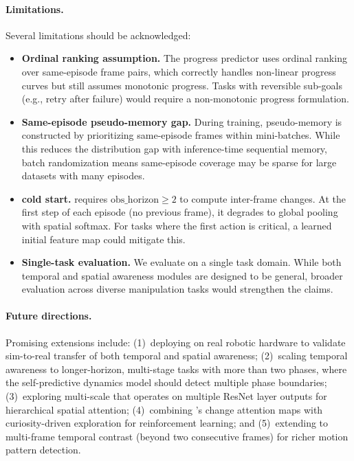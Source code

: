 \paragraph{Limitations.} Several limitations should be acknowledged:
\begin{itemize}[leftmargin=*,itemsep=2pt]
    \item \textbf{Ordinal ranking assumption.} The progress predictor uses ordinal ranking over same-episode frame pairs, which correctly handles non-linear progress curves but still assumes monotonic progress. Tasks with reversible sub-goals (e.g., retry after failure) would require a non-monotonic progress formulation.
    \item \textbf{Same-episode pseudo-memory gap.} During training, pseudo-memory is constructed by prioritizing same-episode frames within mini-batches. While this reduces the distribution gap with inference-time sequential memory, batch randomization means same-episode coverage may be sparse for large datasets with many episodes.
    \item \textbf{\fasa{} cold start.} \fasa{} requires $\text{obs\_horizon} \geq 2$ to compute inter-frame changes. At the first step of each episode (no previous frame), it degrades to global pooling with spatial softmax. For tasks where the first action is critical, a learned initial feature map could mitigate this.
    \item \textbf{Single-task evaluation.} We evaluate on a single task domain. While both temporal and spatial awareness modules are designed to be general, broader evaluation across diverse manipulation tasks would strengthen the claims.
\end{itemize}

\paragraph{Future directions.} Promising extensions include: (1)~deploying \method{} on real robotic hardware to validate sim-to-real transfer of both temporal and spatial awareness; (2)~scaling temporal awareness to longer-horizon, multi-stage tasks with more than two phases, where the self-predictive dynamics model should detect multiple phase boundaries; (3)~exploring multi-scale \fasa{} that operates on multiple ResNet layer outputs for hierarchical spatial attention; (4)~combining \fasa{}'s change attention maps with curiosity-driven exploration for reinforcement learning; and (5)~extending \fasa{} to multi-frame temporal contrast (beyond two consecutive frames) for richer motion pattern detection.
